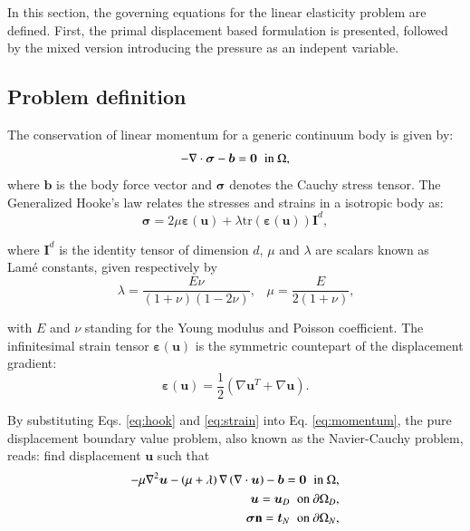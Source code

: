 \documentclass[english,11pt,3p,number,sort&compress]{elsarticle}
\begin{document}
In this section, the governing equations for the linear elasticity problem are defined. First, the primal displacement based formulation is presented, followed by the mixed version introducing the pressure as an indepent variable.

\subsection{Problem definition}

The conservation of linear momentum for a generic continuum body is given by:
\begin{equation} \label{eq:momentum}
		-\nabla \cdot \bm{\sigma} - \bm{b} = \bm{0} \hspace{0.2cm} \text{in } \Omega ,
\end{equation}
\noindent where $\bm{b}$ is the body force vector and $\bm{\sigma}$ denotes the Cauchy stress tensor. The Generalized Hooke's law relates the stresses and strains in a isotropic body as:
\begin{equation} \label{eq:hook}
    \bm{\sigma} = 2\mu \bm{\varepsilon}(\bm{u}) + \lambda \text{tr}(\bm{\varepsilon}(\bm{u})) \bm{I}^d ,
\end{equation}

\noindent where $\mathbf{I}^d$ is the identity tensor of dimension $d$, $\mu$ and $\lambda$ are scalars known as Lam\'{e} constants, given respectively by
\begin{equation}
	\lambda = \frac{E\nu}{(1+\nu)(1-2\nu)} \text{,} \quad \mu = \frac{E}{2(1+\nu)} \text{,}
\end{equation}

\noindent with $E$ and $\nu$ standing for the Young modulus and Poisson coefficient. The infinitesimal strain tensor $\bm{\varepsilon}(\bm{u})$ is the symmetric countepart of the displacement gradient:
\begin{equation} \label{eq:strain}
    \bm{\varepsilon}(\bm{u})=\frac{1}{2}(\nabla\bm{u}^T+\nabla\bm{u}) \text{.}
\end{equation}

By substituting Eqs. \eqref{eq:hook} and \eqref{eq:strain} into Eq. \eqref{eq:momentum}, the pure displacement boundary value problem, also known as the Navier-Cauchy problem, reads: find displacement $\bm{u}$ such that
\begin{subequations} \label{eq:navier-cauchy}
	\begin{align}
		-\mu\nabla^2\bm{u} -\left(\mu+\lambda \right)\nabla\left(\nabla \cdot \bm{u} \right) - \bm{b} = \bm{0} \hspace{0.2cm} \text{in } \Omega ,&\\
		\bm{u} = \bm{u}_D \hspace{0.2cm} \text{on } \partial\Omega_D ,&\\
		\bm{\sigma} \mathbf{n} = \bm{t}_N \hspace{0.2cm} \text{on } \partial\Omega_N ,&
	\end{align}
\end{subequations}
\end{document}
